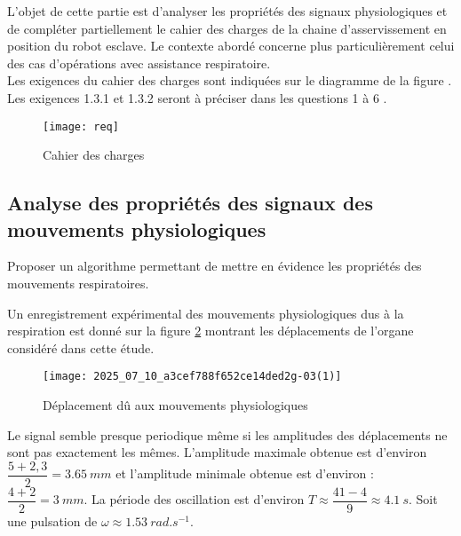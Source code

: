 L'objet de cette partie est d'analyser les propriétés des signaux physiologiques et de compléter partiellement le cahier des charges de la chaine d'asservissement en position du robot esclave. Le contexte abordé concerne plus particulièrement celui des cas d'opérations avec assistance respiratoire.\\
Les exigences du cahier des charges sont indiquées sur le diagramme de la figure \label{ccs_psi_2019_fig_03}. Les exigences 1.3.1 et 1.3.2 seront à préciser dans les questions 1 à 6 .


\begin{figure}[!h]
\centering
\texttt{[image: req]}

\caption{Cahier des charges\label{ccs_psi_2019_fig_03}}
\end{figure}
\fi


\subsection{Analyse des propriétés des signaux des mouvements physiologiques}
\begin{obj}
Proposer un algorithme permettant de mettre en évidence les propriétés des mouvements respiratoires.
\end{obj}

\ifprof
\else
Un enregistrement expérimental des mouvements physiologiques dus à la respiration est donné sur la figure \ref{ccs_psi_2019_fig_04} montrant les déplacements de l'organe considéré dans cette étude.


\begin{figure}[!h]
\centering
\texttt{[image: 2025\_07\_10\_a3cef788f652ce14ded2g-03(1)]}

\caption{Déplacement dû aux mouvements physiologiques\label{ccs_psi_2019_fig_04}}
\end{figure}
\fi

\ifprof
\begin{corrige}
Le signal semble presque periodique même si les amplitudes des déplacements ne sont pas exactement les mêmes.
L'amplitude maximale obtenue est d'environ $\dfrac{5+2,3}{2}=\SI{3,65}{mm}$ et l'amplitude minimale obtenue est d'environ : $\dfrac{4+2}{2}=\SI{3}{mm}$. 
La période des oscillation est d'environ $
T\approx\dfrac{41-4}{9}\approx \SI{4,1}{s}$. 
Soit une pulsation de $\omega\approx \SI{1,53}{rad.s^{-1}}$.
\end{corrige}
\else
\fi

